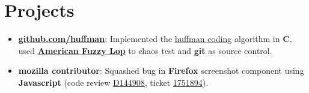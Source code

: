 \section{Projects}

\begin{itemize}[leftmargin=*]
    \item {
        \href{https://github.com/Haximilian/huffman}{\textbf{github.com/huffman}}: Implemented the \href{https://en.wikipedia.org/wiki/Huffman_coding}{huffman coding} algorithm in \textbf{C}, used \href{https://lcamtuf.coredump.cx/afl/}{\textbf{American Fuzzy Lop}} to chaos test and \textbf{git} as source control.
    }
    \item {
        \textbf{mozilla contributor}: Squashed bug in \textbf{Firefox} screenshot component using \textbf{Javascript} (code review \href{https://phabricator.services.mozilla.com/D144908}{D144908}, ticket \href{https://bugzilla.mozilla.org/show_bug.cgi?id=1751894}{1751894}).
    }
\end{itemize}